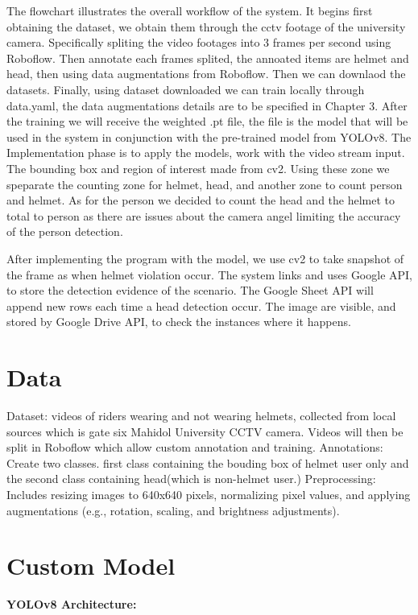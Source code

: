 	 The flowchart illustrates the overall workflow of the system. It begins first obtaining the dataset, we obtain them through the cctv footage of the university camera. Specifically spliting the video footages into 3 frames per second using Roboflow. Then annotate each frames splited, the annoated items are helmet and head, then using data augmentations from Roboflow. Then we can downlaod the datasets. Finally, using dataset downloaded we can train locally through data.yaml, the data augmentations details are to be specified in Chapter 3. After the training we will receive the weighted .pt file, the file is the model that will be used in the system in conjunction with the pre-trained model from YOLOv8. The Implementation phase is to apply the models, work with the video stream input. The bounding box and region of interest made from cv2. Using these zone we speparate the counting zone for helmet, head, and another zone to count person and helmet. As for the person we decided to count the head and the helmet to total to person as there are issues about the camera angel limiting the accuracy of the person detection. 
	
	After implementing the program with the model, we use cv2 to take snapshot of the frame as when helmet violation occur. The system links and uses Google API, to store the detection evidence of the scenario. The Google Sheet API will append new rows each time a head detection occur.  The image are visible, and stored by Google Drive API, to check the instances where it happens.
	
\section{Data}
Dataset: videos of riders wearing and not wearing helmets, collected from local sources which is gate six Mahidol University CCTV camera. Videos will then be split in Roboflow which allow custom annotation and training.
\newline
\newline
Annotations: Create two classes. first class containing the bouding box of helmet user only and the second class containing head(which is non-helmet user.)
\newline
Preprocessing: Includes resizing images to 640x640 pixels, normalizing pixel values, and applying augmentations (e.g., rotation, scaling, and brightness adjustments).


\section{Custom Model}
\textbf{YOLOv8 Architecture:}

